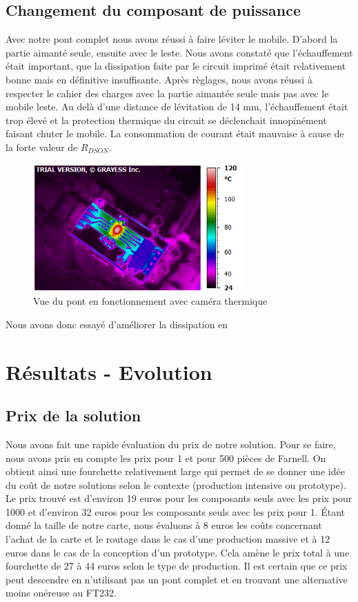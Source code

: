 \documentclass[11pt, french]{article} %
\begin{document}
\subsection{Changement du composant de puissance}
Avec notre pont complet nous avons réussi à faire léviter le mobile. D'abord la partie aimanté seule, ensuite avec le leste. Nous avons constaté que l'échauffement était important, que la dissipation faite par le circuit imprimé était relativement bonne mais en définitive insuffisante. Après règlages, nous avons réussi à respecter le cahier des charges avec la partie aimantée seule mais pas avec le mobile leste. Au delà d'une distance de lévitation de 14 mm, l'échauffement était trop élevé et la protection thermique du circuit se déclenchait innopinément faisant chuter le mobile. La consommation de courant était mauvaise à cause de la forte valeur de $ R_{DSON} $.

\begin{figure}[h!]
	\centering
	\includegraphics[width = 8cm]{SolutionAnalogique/VueThermique.png}
	\caption{Vue du pont en fonctionnement avec caméra thermique}
\end{figure}

Nous avons donc essayé d'améliorer la dissipation en

\section{Résultats - Evolution}

\subsection{Prix de la solution}
Nous avons fait une rapide évaluation du prix de notre solution. Pour se faire, nous avons pris en compte les prix pour 1 et pour 500 pièces de Farnell. On obtient ainsi une fourchette relativement large qui permet de se donner une idée du coût de notre solutions selon le contexte (production intensive ou prototype). Le prix trouvé est d'environ 19 euros pour les composants seuls avec les prix pour 1000 et d'environ 32 euros pour les composants seuls avec les prix pour 1. Étant donné la taille de notre carte, nous évaluons à 8 euros les coûts concernant l'achat de la carte et le routage dans le cas d'une production massive et à 12 euros dans le cas de la conception d'un prototype. Cela amène le prix total à une fourchette de 27 à 44 euros selon le type de production. Il est certain que ce prix peut descendre en n'utilisant pas un pont complet et en trouvant une alternative moins onéreuse au FT232. 
\end{document}
